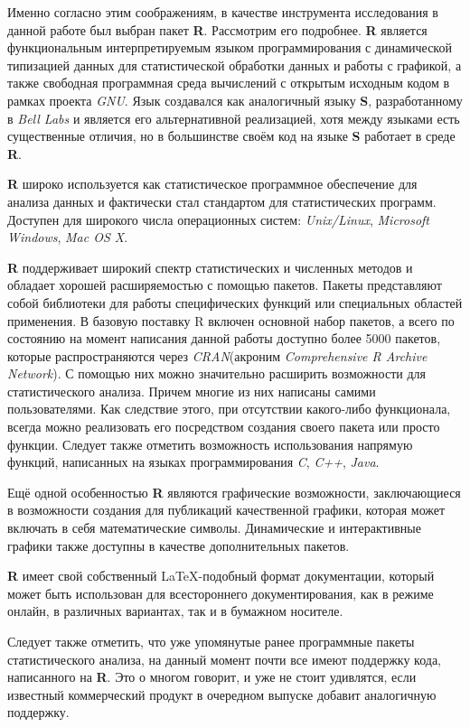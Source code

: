 Именно согласно этим соображениям, в качестве инструмента исследования в данной работе был выбран пакет \textbf{R}. Рассмотрим его подробнее. \textbf{R} является функциональным интерпретируемым языком программирования с динамической типизацией данных для статистической обработки данных и работы с графикой, а также свободная программная среда вычислений с открытым исходным кодом в рамках проекта \textit{GNU}. Язык создавался как аналогичный языку \textbf{S}, разработанному в \textit{Bell Labs} и является его альтернативной реализацией, хотя между языками есть существенные отличия, но в большинстве своём код на языке \textbf{S} работает в среде \textbf{R}.

\textbf{R} широко используется как статистическое программное обеспечение для анализа данных и фактически стал стандартом для статистических программ. Доступен для широкого числа операционных систем: \textit{Unix/Linux}, \textit{Microsoft Windows}, \textit{Mac OS X}.

\textbf{R} поддерживает широкий спектр статистических и численных методов и обладает хорошей расширяемостью с помощью пакетов. Пакеты представляют собой библиотеки для работы специфических функций или специальных областей применения. В базовую поставку R включен основной набор пакетов, а всего по состоянию на момент написания данной работы доступно более 5000 пакетов, которые распространяются через \textit{CRAN}(акроним \textit{Comprehensive R Archive Network}). С помощью них можно значительно расширить возможности для статистического анализа. Причем многие из них написаны самими пользователями. Как следствие этого, при отсутствии какого-либо функционала, всегда можно реализовать его посредством создания своего пакета или просто функции. Следует также отметить возможность использования напрямую функций, написанных на языках программирования \textit{C}, \textit{C++}, \textit{Java}.

Ещё одной особенностью \textbf{R} являются графические возможности, заключающиеся в возможности создания для публикаций качественной графики, которая может включать в себя математические символы. Динамические и интерактивные графики также доступны в качестве дополнительных пакетов.

\textbf{R} имеет свой собственный \LaTeX-подобный формат документации, который может быть использован для всестороннего документирования, как в режиме онлайн, в различных вариантах, так и в бумажном носителе.

Следует также отметить, что уже упомянутые ранее программные пакеты статистического анализа, на данный момент почти все имеют поддержку кода, написанного на \textbf{R}. Это о многом говорит, и уже не стоит удивлятся, если известный коммерческий продукт в очередном выпуске добавит аналогичную поддержку.

